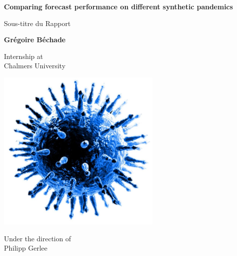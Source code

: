 \documentclass[11pt,a4paper]{article}
\begin{document}
\begin{titlepage}
    \begin{center}
        \vspace*{1cm}
        
        \Huge
        \textbf{Comparing forecast performance on different synthetic pandemics}
        
        \vspace{0.5cm}
        \LARGE
        Sous-titre du Rapport
        
        \vspace{1.5cm}
        
        \textbf{Grégoire Béchade}
        
        \vfill
        
        \Large
        Internship at \\
        Chalmers University
        
        \vspace{0.8cm}
        
        \includegraphics[width=0.6\textwidth]{figures/le virus_découpé_bis.jpg}
        
        \vfill
        
        \Large
        Under the direction of \\
        Philipp Gerlee
        
        \vspace{0.8cm}
        
    \end{center}
\end{titlepage}

\newpage
\thispagestyle{empty}
\mbox{}
\newpage

\tableofcontents
\newpage







\printbibliography %
\end{document}
